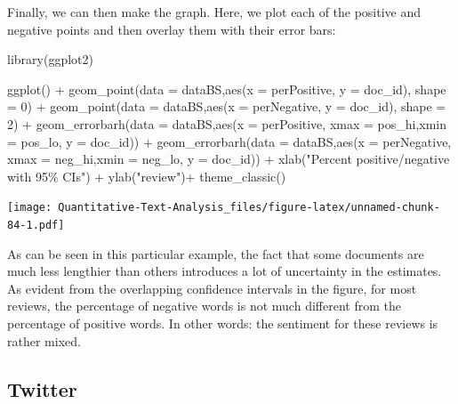 \documentclass[
]{book}
\newenvironment{Shaded}{\begin{snugshade}}{\end{snugshade}}
\newcommand{\AttributeTok}[1]{\textcolor[rgb]{0.77,0.63,0.00}{#1}}
\newcommand{\DecValTok}[1]{\textcolor[rgb]{0.00,0.00,0.81}{#1}}
\newcommand{\FunctionTok}[1]{\textcolor[rgb]{0.00,0.00,0.00}{#1}}
\newcommand{\NormalTok}[1]{#1}
\newcommand{\SpecialCharTok}[1]{\textcolor[rgb]{0.00,0.00,0.00}{#1}}
\newcommand{\StringTok}[1]{\textcolor[rgb]{0.31,0.60,0.02}{#1}}
\begin{document}
Finally, we can then make the graph. Here, we plot each of the positive and negative points and then overlay them with their error bars:

\begin{Shaded}
\begin{Highlighting}[]
\FunctionTok{library}\NormalTok{(ggplot2)}

\FunctionTok{ggplot}\NormalTok{() }\SpecialCharTok{+}
 \FunctionTok{geom\_point}\NormalTok{(}\AttributeTok{data =}\NormalTok{ dataBS,}\FunctionTok{aes}\NormalTok{(}\AttributeTok{x =}\NormalTok{ perPositive, }\AttributeTok{y =}\NormalTok{ doc\_id), }\AttributeTok{shape =} \DecValTok{0}\NormalTok{) }\SpecialCharTok{+}
 \FunctionTok{geom\_point}\NormalTok{(}\AttributeTok{data =}\NormalTok{ dataBS,}\FunctionTok{aes}\NormalTok{(}\AttributeTok{x =}\NormalTok{ perNegative, }\AttributeTok{y =}\NormalTok{ doc\_id), }\AttributeTok{shape =} \DecValTok{2}\NormalTok{) }\SpecialCharTok{+}
 \FunctionTok{geom\_errorbarh}\NormalTok{(}\AttributeTok{data =}\NormalTok{ dataBS,}\FunctionTok{aes}\NormalTok{(}\AttributeTok{x =}\NormalTok{ perPositive, }\AttributeTok{xmax =}\NormalTok{ pos\_hi,}\AttributeTok{xmin =}\NormalTok{ pos\_lo, }\AttributeTok{y =}\NormalTok{ doc\_id)) }\SpecialCharTok{+}
 \FunctionTok{geom\_errorbarh}\NormalTok{(}\AttributeTok{data =}\NormalTok{ dataBS,}\FunctionTok{aes}\NormalTok{(}\AttributeTok{x =}\NormalTok{ perNegative, }\AttributeTok{xmax =}\NormalTok{ neg\_hi,}\AttributeTok{xmin =}\NormalTok{ neg\_lo, }\AttributeTok{y =}\NormalTok{ doc\_id)) }\SpecialCharTok{+}
 \FunctionTok{xlab}\NormalTok{(}\StringTok{"Percent positive/negative with 95\% CIs"}\NormalTok{) }\SpecialCharTok{+}
 \FunctionTok{ylab}\NormalTok{(}\StringTok{"review"}\NormalTok{)}\SpecialCharTok{+}
 \FunctionTok{theme\_classic}\NormalTok{()}
\end{Highlighting}
\end{Shaded}

\texttt{[image: Quantitative-Text-Analysis\_files/figure-latex/unnamed-chunk-84-1.pdf]}

As can be seen in this particular example, the fact that some documents are much less lengthier than others introduces a lot of uncertainty in the estimates. As evident from the overlapping confidence intervals in the figure, for most reviews, the percentage of negative words is not much different from the percentage of positive words. In other words: the sentiment for these reviews is rather mixed.

\hypertarget{twitter}{%
\subsection{Twitter}\label{twitter}}
\end{document}
